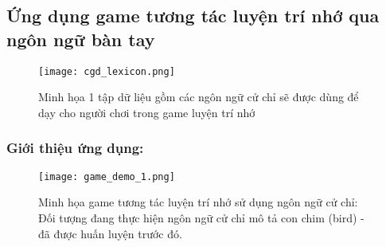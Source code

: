 \subsection{Ứng dụng game tương tác luyện trí nhớ qua ngôn ngữ bàn tay}
\begin{figure}
\centering
\texttt{[image: cgd\_lexicon.png]}
\caption{Minh họa 1 tập dữ liệu gồm các ngôn ngữ cử chỉ sẽ được dùng để dạy cho người chơi trong game luyện trí nhớ}
\label{fig_cgd_lexicon}
\end{figure}

\subsubsection{Giới thiệu ứng dụng:}
\begin{figure}
\centering
\texttt{[image: game\_demo\_1.png]}
\caption{Minh họa game tương tác luyện trí nhớ sử dụng ngôn ngữ cử chỉ: Đối tượng đang thực hiện ngôn ngữ cử chỉ mô tả con chim (bird) - đã được huấn luyện trước đó.}
\label{fig_game_gest_1}
\end{figure}

